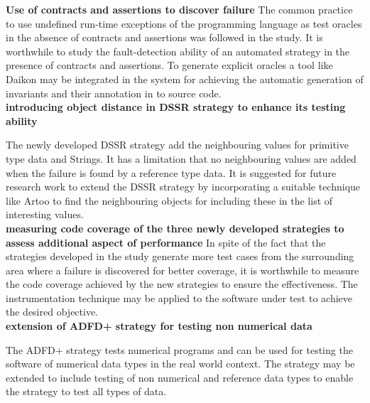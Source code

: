 \textbf{Use of contracts and assertions to discover failure}
The common practice to use undefined run-time exceptions of the programming language as test oracles in the absence of contracts and assertions was followed in the study. It is worthwhile to study the fault-detection ability of an automated strategy in the presence of contracts and assertions. To generate explicit oracles a tool like Daikon may be integrated in the system for achieving the automatic generation of invariants and their annotation in to source code.\\

\textbf{introducing object distance in DSSR strategy to enhance its testing ability}

The newly developed DSSR strategy add the neighbouring values for primitive type data and Strings. It has a limitation that no neighbouring values are added when the failure is found by  a reference type data. It is suggested for future research work to extend the DSSR strategy by incorporating a suitable technique like Artoo to find the neighbouring objects for including these in the list of interesting values.  \\


\textbf{measuring code coverage of the three newly developed strategies to assess additional aspect of performance}
In spite of the fact that the strategies developed in the study generate more test cases from the surrounding area where a failure is discovered for better coverage, it is worthwhile to measure the code coverage achieved by the new strategies to ensure the effectiveness. The instrumentation technique may be applied to the software under test to achieve the desired objective. \\

\textbf{extension of ADFD+ strategy for testing non numerical data}

The ADFD+ strategy tests numerical programs and can be used for testing the software of numerical data types in the real world context. The strategy may be extended to include testing of  
non numerical and reference data types to enable the strategy to test all types of data. \\





